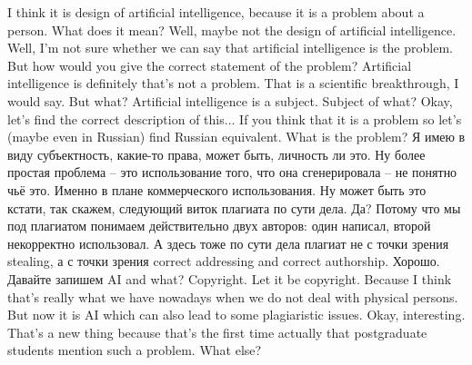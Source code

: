 \documentclass[main.tex]{subfiles}
\begin{document}
I think it is design of artificial intelligence, because it is a problem about a person.
What does it mean?
Well, maybe not the design of artificial intelligence.
Well, I'm not sure whether we can say that artificial intelligence is the problem.
But how would you give the correct statement of the problem?
Artificial intelligence is definitely that's not a problem.
That is a scientific breakthrough, I would say.
But what? 
Artificial intelligence is a subject.
Subject of what?
Okay, let's find the correct description of this...
If you think that it is a problem so let's (maybe even in Russian) find Russian equivalent.
What is the problem?
Я имею в виду субъектность, какие-то права, может быть, личность ли это.
Ну более простая проблема -- это использование того, что она сгенерировала -- не понятно чьё это.
Именно в плане коммерческого использования.
Ну может быть это кстати, так скажем, следующий виток плагиата по сути дела.
Да?
Потому что мы под плагиатом понимаем действительно двух авторов: один написал, второй некорректно использовал.
А здесь тоже по сути дела плагиат не с точки зрения stealing, а с точки зрения correct addressing and correct authorship.
Хорошо.
Давайте запишем AI and what? Copyright.
Let it be copyright.
Because I think that's really what we have nowadays when we do not deal with physical persons.
But now it is AI which can also lead to some plagiaristic issues.
Okay, interesting.
That's a new thing because that's the first time actually that postgraduate students mention such a problem.
What else?
\end{document}
